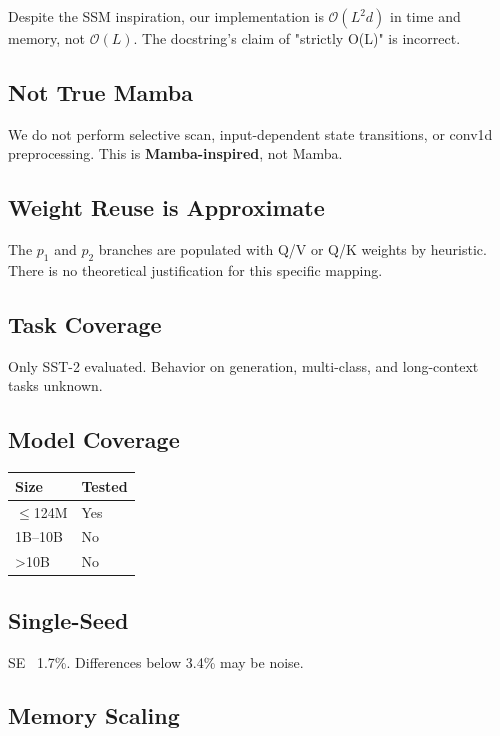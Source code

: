 Despite the SSM inspiration, our implementation is \textbf{$\mathcal{O}(L^2 d)$} in 
time and memory, not $\mathcal{O}(L)$. The docstring's claim of "strictly 
O(L)" is incorrect.

\subsection{Not True Mamba}

We do not perform selective scan, input-dependent state transitions, or 
conv1d preprocessing. This is \textbf{Mamba-inspired}, not Mamba.

\subsection{Weight Reuse is Approximate}

The $p_1$ and $p_2$ branches are populated with Q/V or Q/K weights by 
heuristic. There is no theoretical justification for this specific mapping.

\subsection{Task Coverage}

Only SST-2 evaluated. Behavior on generation, multi-class, and long-context 
tasks unknown.

\subsection{Model Coverage}

\begin{table}[H]
\centering
\small
\begin{tabular}{ll}
\toprule
\textbf{Size} & \textbf{Tested} \\
\midrule
$\le$124M & Yes \\
1B--10B & No \\
>10B & No \\
\bottomrule
\end{tabular}
\end{table}

\subsection{Single-Seed}

SE ~1.7\%. Differences below 3.4\% may be noise.

\subsection{Memory Scaling}

